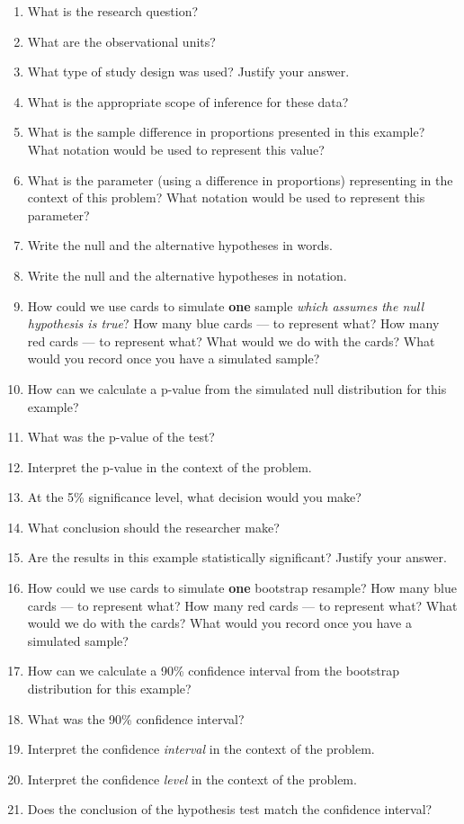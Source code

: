 \documentclass[
]{report}
\newcommand{\rgs}{\vspace{12pt}} %
\begin{document}
\begin{enumerate}
\def\labelenumi{\arabic{enumi}.}
\item
  What is the research question?
  \rgs
\item
  What are the observational units?
  \rgs
\item
  What type of study design was used? Justify your answer.
  \rgs
\item
  What is the appropriate scope of inference for these data?
  \rgs
\item
  What is the sample difference in proportions presented in this example? What notation would be used to represent this value?
  \rgs
\item
  What is the parameter (using a difference in proportions) representing in the context of this problem? What notation would be used to represent this parameter?
  \rgs
  \rgs
\item
  Write the null and the alternative hypotheses in words.
  \rgs
  \rgs
\item
  Write the null and the alternative hypotheses in notation.
  \rgs
\item
  How could we use cards to simulate \textbf{one} sample \emph{which assumes the null hypothesis is true}? How many blue cards --- to represent what? How many red cards --- to represent what? What would we do with the cards? What would you record once you have a simulated sample?
  \rgs
  \rgs
  \rgs
\item
  How can we calculate a p-value from the simulated null distribution for this example?
  \rgs
  \rgs
\item
  What was the p-value of the test?
  \rgs
\item
  Interpret the p-value in the context of the problem.
  \rgs
  \rgs
\item
  At the 5\% significance level, what decision would you make?
  \rgs
\item
  What conclusion should the researcher make?
  \rgs
  \rgs
\item
  Are the results in this example statistically significant? Justify your answer.
  \rgs
\item
  How could we use cards to simulate \textbf{one} bootstrap resample? How many blue cards --- to represent what? How many red cards --- to represent what? What would we do with the cards? What would you record once you have a simulated sample?
  \rgs
  \rgs
  \rgs
\item
  How can we calculate a 90\% confidence interval from the bootstrap distribution for this example?
  \rgs
\item
  What was the 90\% confidence interval?
  \rgs
\item
  Interpret the confidence \emph{interval} in the context of the problem.
  \rgs
  \rgs
\item
  Interpret the confidence \emph{level} in the context of the problem.
  \rgs
  \rgs
\item
  Does the conclusion of the hypothesis test match the confidence interval?
  \rgs
\end{enumerate}
\end{document}

